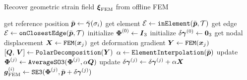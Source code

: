 \begin{algorithm}[!t]
    \caption{Recover geometric strain field ${\boldsymbol{\xi}}_{\textrm{FEM}}$ from offline FEM \label{algo:C5:fem_reconstruction}}
    


    {
        get reference position $\bar{{\boldsymbol{p}}} \gets \bar{{\boldsymbol{\gamma}}}(\sigma_i)$ \;
        get element $\mathcal{E} \gets \texttt{inElement}(\bar{{\boldsymbol{p}}},\mathcal{T})$ \;
        {
            get edge $\mathcal{E} \gets \texttt{onClosestEdge}(\bar{{\boldsymbol{p}}},\mathcal{T})$\;
        }
        initialize $\boldsymbol{\Phi}^{(0)} \gets \boldsymbol{I}_3$ \;
        initialize $\delta {\boldsymbol{\gamma}}^{(0)} \gets \boldsymbol{0}_3$ \;
        {
            get nodal displacement $\boldsymbol{X} \gets \texttt{FEM}(\boldsymbol{x}_j)$ \;
            get deformation gradient $\boldsymbol{Y} \gets \texttt{FEM}(\boldsymbol{x}_j)$ \;
            $[\boldsymbol{Q},\,\boldsymbol{V}] \gets \texttt{PolarDecomposition}(\boldsymbol{Y})$ \;
            $\alpha \gets \texttt{ElementInterpolation}(\bar{{\boldsymbol{p}}})$ \;
            update ${\boldsymbol{\Phi}}^{(j)} \gets \texttt{AverageSO3}({\boldsymbol{\Phi}}^{(j)},\alpha\boldsymbol{Q})$ \;
            update $\delta{\boldsymbol{\gamma}}^{(j)} \gets \delta{\boldsymbol{\gamma}}^{(j)} + \alpha \boldsymbol{X}$ \;
        }
        ${\boldsymbol{g}}_{\textrm{FEM}}^{(i)} \gets \texttt{SE3}({\boldsymbol{\Phi}}^{(j)},\bar{{\boldsymbol{p}}} + \delta{\boldsymbol{\gamma}}^{(j)})$\;
    }

\end{algorithm}

